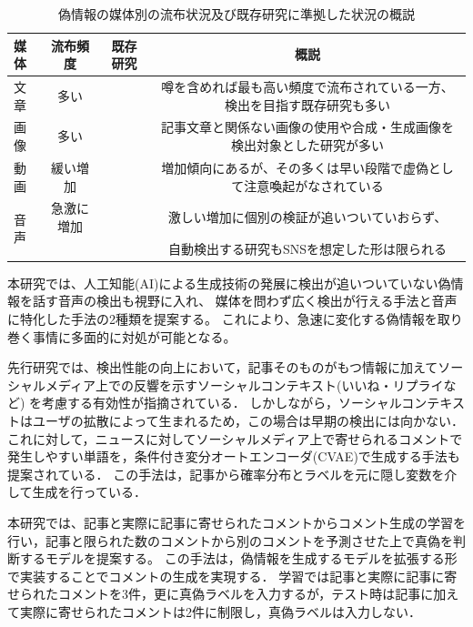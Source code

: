 \begin{landscape}
\begin{table}[p]
    \centering
    \begin{tabular}{l|c|c|c} \hline
       媒体 & 流布頻度 & 既存研究 & 概説\\ \hline\hline
       文章 & 多い & \cite{yanagi2021classifying,10.1145/3292500.3330935} & 噂を含めれば最も高い頻度で流布されている一方、検出を目指す既存研究も多い \\
       画像 & 多い & \cite{Wang:2018:EEA:3219819.3219903,8919302} & 記事文章と関係ない画像の使用や合成・生成画像を検出対象とした研究が多い \\
       動画 & 緩い増加 \cite{Ulmer_Tong_2023} & \cite{8683164,8668407} & 増加傾向にあるが、その多くは早い段階で虚偽として注意喚起がなされている \\
       \multirow{2}{*}{音声} & 急激に増加 & \multirow{2}{*}{\cite{yamagishi21_asvspoof}} & %
       激しい増加に個別の検証が追いついていおらず、\\
       & \cite{cox_2023,Ulmer_Tong_2023} & & 自動検出する研究もSNSを想定した形は限られる \\ \hline
    \end{tabular}
    \caption{偽情報の媒体別の流布状況及び既存研究に準拠した状況の概説}
    \label{tab:modality}
\end{table}
\end{landscape}

本研究では、人工知能(AI)による生成技術の発展に検出が追いついていない偽情報を話す音声の検出も視野に入れ、
媒体を問わず広く検出が行える手法と音声に特化した手法の2種類を提案する。
これにより、急速に変化する偽情報を取り巻く事情に多面的に対処が可能となる。

先行研究では、検出性能の向上において，記事そのものがもつ情報に加えてソーシャルメディア上での反響を示すソーシャルコンテキスト(いいね・リプライなど)
を考慮する有効性が指摘されている\cite{Guo:2018:RDH:3269206.3271709}．
しかしながら，ソーシャルコンテキストはユーザの拡散によって生まれるため，この場合は早期の検出には向かない．
これに対して，ニュースに対してソーシャルメディア上で寄せられるコメントで発生しやすい単語を，条件付き変分オートエンコーダ(CVAE)で生成する手法も提案されている\cite{ijcai2018-533}．
この手法は，記事から確率分布とラベルを元に隠し変数を介して生成を行っている．

本研究では、記事と実際に記事に寄せられたコメントからコメント生成の学習を行い，記事と限られた数のコメントから別のコメントを予測させた上で真偽を判断するモデルを提案する。
この手法は，偽情報を生成するモデル\cite{DBLP:journals/corr/abs-1905-12616}を拡張する形で実装することでコメントの生成を実現する．
学習では記事と実際に記事に寄せられたコメントを3件，更に真偽ラベルを入力するが，テスト時は記事に加えて実際に寄せられたコメントは2件に制限し，真偽ラベルは入力しない．

